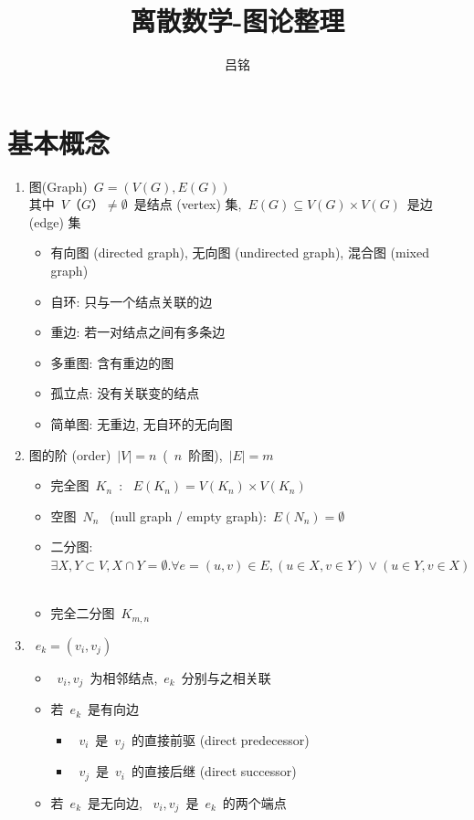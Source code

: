 \documentclass[11pt,a4paper]{article}%
\renewcommand{\[}{~$}
\renewcommand{\]}{$~}%
\begin{document}
\title{离散数学-图论整理}
\author{吕铭}
\date{}
\maketitle
\section{基本概念}
	\begin{enumerate}
	 \item 图(Graph)\[G = (V(G), E(G))\]\\
	 	其中\[V（G）\neq \emptyset\]是结点 (vertex) 集,\[E(G)\subseteq V(G)\times V(G)\]是边 (edge) 集
	 	\begin{itemize}
	 	  \item 有向图 (directed graph), 无向图 (undirected graph), 混合图 (mixed graph)
		  \item 自环: 只与一个结点关联的边
		  \item 重边: 若一对结点之间有多条边
		  \item 多重图: 含有重边的图
		  \item 孤立点: 没有关联变的结点
		  \item 简单图: 无重边, 无自环的无向图 
	 	\end{itemize}
	 \item 图的阶 (order)\[|V|=n\](\[n\]阶图),\[|E|=m\]
	 	\begin{itemize}
	 	 \item 完全图\[K_n\]: \[E(K_n) = V(K_n)\times V(K_n)\]
	 	 \item 空图\[N_n\] (null graph / empty graph):\[E(N_n)=\emptyset\]
	 	 \item 二分图: \[\exists X,Y\subset V, X\cap Y = \emptyset. \forall e=(u,v)\in E, (u\in X, v\in Y) \lor (u\in Y, v\in X)\]
	 	 \item 完全二分图\[K_{m,n}\]
	 	\end{itemize}
	 \item \[e_k = (v_i,v_j)\]
	 	\begin{itemize}
	 	 \item \[v_i,v_j\]为相邻结点,\[e_k\]分别与之相关联
	 	 \item 若\[e_k\]是有向边
	 	 	\begin{itemize}
	 	 	 \item \[v_i\]是\[v_j\]的直接前驱 (direct predecessor)
	 	 	 \item \[v_j\]是\[v_i\]的直接后继 (direct successor)
	 	 	\end{itemize}
	 	 \item 若\[e_k\]是无向边, \[v_i,v_j\]是\[e_k\]的两个端点

\end{itemize}
\end{enumerate}
\end{document}
